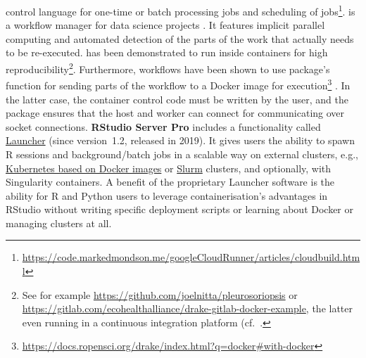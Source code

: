 control language for one-time or batch processing jobs and scheduling of
jobs\footnote{\href{https://code.markedmondson.me/googleCloudRunner/articles/cloudbuild.html}{https://code.markedmondson.me/googleCloudRunner/articles/cloudbuild.html}}.
\label{drake} \textbf{} is a workflow manager for data
science projects \citep{landau_drake_2019}. It features implicit
parallel computing and automated detection of the parts of the work that
actually needs to be re-executed.  has been demonstrated to
run inside containers for high
reproducibility\footnote{See for example \href{https://github.com/joelnitta/pleurosoriopsis}{https://github.com/joelnitta/pleurosoriopsis} or \href{https://gitlab.com/ecohealthalliance/drake-gitlab-docker-example}{https://gitlab.com/ecohealthalliance/drake-gitlab-docker-example}, the latter even running in a continuous integration platform (cf.~.}.
Furthermore,  workflows have been shown to use 
package's function  for sending parts of the
workflow to a Docker image for
execution\footnote{\href{https://docs.ropensci.org/drake/index.html?q=docker\#with-docker}{https://docs.ropensci.org/drake/index.html?q=docker\#with-docker}}
\citep[see package's function documentation;~][]{future_2020}. In the
latter case, the container control code must be written by the user, and
the  package ensures that the host and worker can connect
for communicating over socket connections. \textbf{RStudio Server Pro}
includes a functionality called
\href{https://solutions.rstudio.com/launcher/overview/}{Launcher} (since
version~1.2, released in 2019). It gives users the ability to spawn R
sessions and background/batch jobs in a scalable way on external
clusters, e.g.,
\href{https://support.rstudio.com/hc/en-us/articles/360019253393-Using-Docker-images-with-RStudio-Server-Pro-Launcher-and-Kubernetes}{Kubernetes
based on Docker images} or \href{https://slurm.schedmd.com/}{Slurm}
clusters, and optionally, with Singularity containers. A benefit of the
proprietary Launcher software is the ability for R and Python users to
leverage containerisation's advantages in RStudio without writing
specific deployment scripts or learning about Docker or managing
clusters at all.

